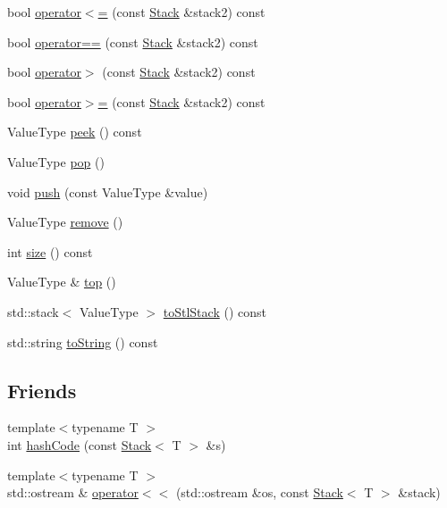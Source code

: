\begin{DoxyCompactItemize}
\item 
bool \mbox{\hyperlink{classStack_a8037a3a4cc044bcfba994893d6f4ab12}{operator$<$=}} (const \mbox{\hyperlink{classStack}{Stack}} \&stack2) const
\item 
bool \mbox{\hyperlink{classStack_ade246b6899202c53b8fd8fbe4930b09a}{operator==}} (const \mbox{\hyperlink{classStack}{Stack}} \&stack2) const
\item 
bool \mbox{\hyperlink{classStack_a5031b32af5984055de8e2bdd4f7312c4}{operator$>$}} (const \mbox{\hyperlink{classStack}{Stack}} \&stack2) const
\item 
bool \mbox{\hyperlink{classStack_ad2ffb92607a0ad29b040677a695ccea8}{operator$>$=}} (const \mbox{\hyperlink{classStack}{Stack}} \&stack2) const
\item 
Value\+Type \mbox{\hyperlink{classStack_a7fcf31135d35acfa8ab1174c44bf28f3}{peek}} () const
\item 
Value\+Type \mbox{\hyperlink{classStack_a278630d7ff14886cdbc3585527e91733}{pop}} ()
\item 
void \mbox{\hyperlink{classStack_a3fa54a00594a4b33b29b45c98c9f6ed4}{push}} (const Value\+Type \&value)
\item 
Value\+Type \mbox{\hyperlink{classStack_a025ec97fa5b04552f5ad0902c1f02ac1}{remove}} ()
\item 
int \mbox{\hyperlink{classStack_af9593d4a5ff4274efaf429cb4f9e57cc}{size}} () const
\item 
Value\+Type \& \mbox{\hyperlink{classStack_af4e7b293e5989a3737c116dbf8f4eaf2}{top}} ()
\item 
std\+::stack$<$ Value\+Type $>$ \mbox{\hyperlink{classStack_a3a9d23b9230220abe769aa0ee5972498}{to\+Stl\+Stack}} () const
\item 
std\+::string \mbox{\hyperlink{classStack_a1fe5121d6528fdea3f243321b3fa3a49}{to\+String}} () const
\end{DoxyCompactItemize}
\subsection*{Friends}
\begin{DoxyCompactItemize}
\item 
{\footnotesize template$<$typename T $>$ }\\int \mbox{\hyperlink{classStack_add24e0ce849c0b2045c24ee3fba490ea}{hash\+Code}} (const \mbox{\hyperlink{classStack}{Stack}}$<$ T $>$ \&s)
\item 
{\footnotesize template$<$typename T $>$ }\\std\+::ostream \& \mbox{\hyperlink{classStack_a047eaf65350ba824d7aa36c925289d9c}{operator$<$$<$}} (std\+::ostream \&os, const \mbox{\hyperlink{classStack}{Stack}}$<$ T $>$ \&stack)
\end{DoxyCompactItemize}


